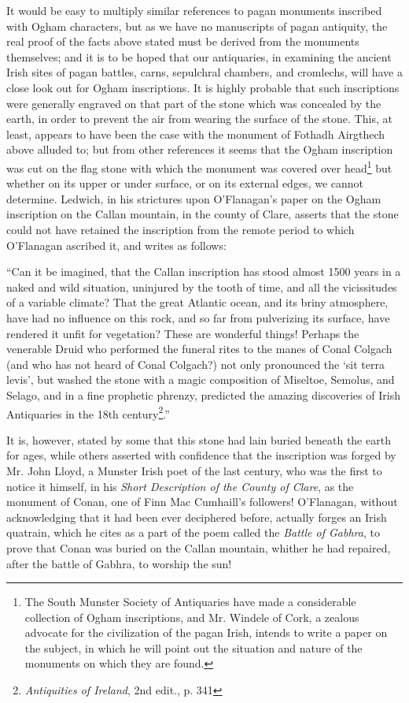 \documentclass[11pt,oneside]{memoir}
\begin{document}
It would be easy to multiply similar references to pagan monuments inscribed with Ogham characters, but as we have no manuscripts of pagan antiquity, the real proof of the facts above stated must be derived from the monuments themselves; and it is to be hoped that our antiquaries, in examining the  ancient Irish sites of pagan battles, carns, sepulchral chambers, and cromlechs, will have a close look out for Ogham inscriptions.
It is highly probable that such inscriptions were generally engraved on that part of the stone which was concealed by the earth, in order to prevent the air from wearing the surface of the stone.
This, at least, appears to have been the case with the monument of Fothadh Airgthech above alluded to; but from other references it seems that the Ogham inscription was cut on the flag stone with which the monument was covered over head\footnote{
    The South Munster Society of Antiquaries have made a considerable collection of Ogham inscriptions, and Mr. Windele of Cork, a zealous advocate for the civilization of the pagan Irish, intends to write a paper on the subject, in which he will point out the situation and nature of the monuments on which they are found.
} but whether on its upper or under surface, or on its external edges, we cannot determine.
Ledwich, in his strictures upon O'Flanagan's paper on the Ogham inscription on the Callan mountain, in the county of Clare, asserts that the stone could not have retained the inscription from the remote period to which 
O'Flanagan ascribed it, and writes as follows: 


``Can it be imagined, that the Callan inscription has stood almost 1500 years in a naked and wild situation, uninjured by the tooth of time, and all the vicissitudes of a variable climate?
That the great Atlantic ocean, and its briny atmosphere, have had no influence on this rock, and so far from pulverizing its surface, have rendered it unfit for vegetation?
These are wonderful things!
Perhaps the venerable Druid who performed the funeral rites to the manes of Conal Colgach (and who has not heard of Conal Colgach?) not only pronounced the `sit terra levis', but washed the stone with a magic composition of Miseltoe, Semolus, and Selago, and in a fine prophetic phrenzy, predicted the amazing discoveries of Irish Antiquaries in the 18th century\footnote{
    \textit{Antiquities of Ireland}, 2nd edit., p. 341
}.''


It is, however, stated by some that this stone had lain buried beneath the earth for ages, while others asserted with confidence that the inscription was forged by Mr. John Lloyd, a Munster Irish poet of the last century, who was the first to notice it himself, in his \textit{Short Description of the County of Clare}, as the monument of Conan, one of Finn Mac Cumhaill's followers!
O'Flanagan, without acknowledging that it had been ever deciphered before, actually forges an Irish quatrain, which he cites as a part of the poem called the \textit{Battle of Gabhra}, to prove that Conan was buried on the Callan mountain, whither he had repaired, after the battle of Gabhra, to worship the sun!
\end{document}
